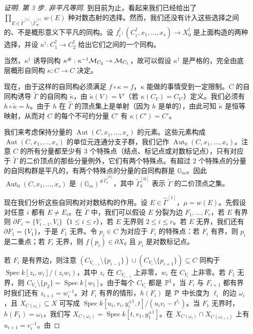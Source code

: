 \begin{proof}[证明]
\emph{第 3 步. 非平凡等同.} 到目前为止，看起来我们已经给出了 $\prod_{E\in\tilde\Gamma^{[1]}\setminus\tilde\Gamma^{[1]}_\infty}w(E)$ 种对数态射的选择。然而，我们还没有计入这些选择之间的、不是概形意义下平凡的同构。设 $f_i^\dagger:(C_i^\dagger,x_1,\dots,x_s)\to X_0^\dagger$ 是上面构造的两种选择，并设 $\kappa^\dagger:C_1^\dagger\to C_2^\dagger$ 给出它们之间的一个同构。

当然，$\kappa^\dagger$ 诱导同构 $\kappa^\#:\kappa^{-1}\mathcal{M}_{C_2}\to\mathcal{M}_{C_1}$，故可以假设 $\kappa^\dagger$ 是严格的，完全由底层概形自同构 $\kappa:C\to C$ 决定。

现在，由于这样的自同构必须满足 $f\circ\kappa=f$，$\kappa$ 能做的事情受到一定限制。$C$ 的自同构诱导 $\tilde\Gamma$ 的自同构 $\tilde\kappa$，由 $\tilde\kappa(V)=V'$（若 $\kappa(C_V)=C_{V'}$）定义。我们必须有 $h\circ\tilde\kappa=h$。由于 $h$ 在 $\hat\Gamma$ 的顶点集上是单射（因为 $h$ 是单的），由此可知 $\tilde\kappa$ 是恒等映射，从而对 $C$ 的每个不可约分量 $C'$ 有 $\kappa(C')=C'$。

我们来考虑保持分量的 $\operatorname{Aut}(C,x_1,\dots,x_s)$ 的元素。这些元素构成 $\operatorname{Aut}(C,x_1,\dots,x_s)$ 的单位元连通分支子群，我们记作 $\operatorname{Aut}_0(C,x_1,\dots,x_s)$。注意 $C$ 的所有分量都至少有 $3$ 个特殊点（结点、标记点或对数标记点），只有对应于 $\tilde\Gamma$ 的二价顶点的那些分量例外，它们有两个特殊点。有超过 $2$ 个特殊点的分量的自同构群是平凡的，有两个特殊点的分量的自同构群是 $\mathbb{G}_m$。因此 $\operatorname{Aut}_0(C,x_1,\dots,x_s)$ 是 $(\mathbb{G}_m)^{\#\tilde\Gamma^{[0]}_b}$，其中 $\tilde\Gamma^{[0]}_b$ 表示 $\tilde\Gamma$ 的二价顶点之集。

现在我们分析这些自同构对对数结构的作用。设 $E\in\hat\Gamma^{[1]}$，$\mu=w(E)$。先假设对任意 $i$ 都有 $E\ne E_i$。在 $\tilde\Gamma$ 中，我们可以假设 $E$ 分裂为边 $F_1,\dots,F_r$，若 $E$ 有界则 $\partial F_i=\{V_{i-1},V_i\}$（$1\le i\le r$），若 $E$ 无界则 $2\le i\le r$。若 $E$ 无界，我们还有 $\partial F_1=\{V_1\}$，于是 $F_1$ 无界。令 $p_i\in C$ 为对应于 $F_i$ 的特殊点：若 $F_i$ 有界，则 $p_i$ 是二重点；若 $F_i$ 无界，则 $f(p_i)\in\partial X_0$ 且 $p_i$ 是对数标记点。

若 $F_i$ 是有界边，则注意 $(C_{V_{i-1}}\setminus\{p_{i-1}\})\cup(C_{V_i}\setminus\{p_{i+1}\})\subseteq C$ 同构于 $\operatorname{Spec}k[z_i,w_i]/(z_iw_i)$，其中 $z_i$ 在 $C_{V_{i-1}}$ 上非零，$w_i$ 在 $C_{V_i}$ 上非零。若 $F_1$ 无界，则 $C_{V_1}\setminus\{p_2\}=\operatorname{Spec}k[w_1]$。由于每个 $C_{V_i}$ 都是 $\mathbb{P}^1$，当 $F_i$ 与 $F_{i+1}$ 都有界时我们还有 $z_{i+1}=w_i^{-1}$。对 $F_i$ 有界的情形，$h(F_i)$ 是 $\mathcal{P}$ 中长度为 $\ell_i$ 的边 $\omega_i$，且 $X_{C(\omega_i)}\subseteq X$ 可写成 $\operatorname{Spec}k[u_i,v_i,y_i^{\pm1},t]/(u_iv_i-t^{\ell_i})$。当 $F_1$ 无界时，$h(F_1)=\omega_1$，我们写 $X_{C(\omega_1)}=\operatorname{Spec}k[t,v_1,y_1^{\pm1}]$。在 $X_{C(\omega_i)}\cap X_{C(\omega_{i+1})}$ 上有 $u_{i+1}=v_i^{-1}$。由


\end{proof}
